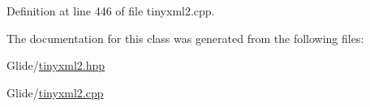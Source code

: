 Definition at line 446 of file tinyxml2.\-cpp.



The documentation for this class was generated from the following files\-:\begin{DoxyCompactItemize}
\item 
Glide/\hyperlink{tinyxml2_8hpp}{tinyxml2.\-hpp}\item 
Glide/\hyperlink{tinyxml2_8cpp}{tinyxml2.\-cpp}\end{DoxyCompactItemize}
